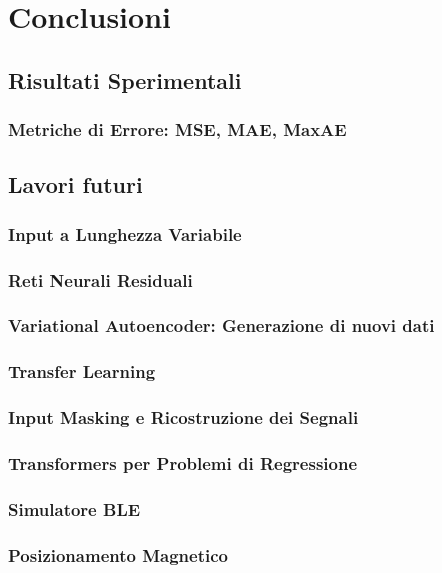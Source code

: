 \documentclass[12pt]{report}
\begin{document}
\chapter{Conclusioni}
\section{Risultati Sperimentali}
\subsection{Metriche di Errore: MSE, MAE, MaxAE}

\section{Lavori futuri}
\subsection{Input a Lunghezza Variabile}
\subsection{Reti Neurali Residuali}
\subsection{Variational Autoencoder: Generazione di nuovi dati}
\subsection{Transfer Learning}
\subsection{Input Masking e Ricostruzione dei Segnali}
\subsection{Transformers per Problemi di Regressione}
\subsection{Simulatore BLE}
\subsection{Posizionamento Magnetico}

\appendix

\printbibliography
\end{document}
